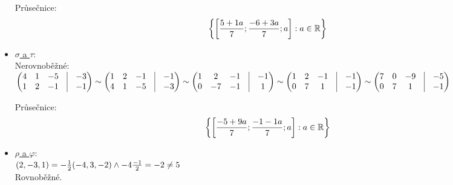 \begin{itemize}
		Průsečnice:
		  $$
			 \left\{{\left[{\frac{5+1 a}{7}; \frac{-6+3 a}{7}; a}\right]:a \in \mathbb{R}}\right\}
		 $$
	\item \underline{$\sigma$ a $\tau$}: \\
		Nerovnoběžné:\\
		 $ \begin{pmatrix}
			 4 &1 &-5 &\vline& -3 \\ 
			 1 &2 &-1 &\vline& -1 \\ 
		 \end{pmatrix}
		 \sim
		 \begin{pmatrix}
			 1 &2 &-1 &\vline& -1 \\ 
			 4 &1 &-5 &\vline& -3 \\ 
		 \end{pmatrix}
		 \sim
		 \begin{pmatrix}
			 1 &2 &-1 &\vline& -1 \\ 
			 0 &-7 &-1 &\vline& 1 \\ 
		 \end{pmatrix}
		 \sim
		 \begin{pmatrix}
			 1 &2 &-1 &\vline& -1 \\ 
			 0 &7 &1 &\vline& -1 \\ 
		 \end{pmatrix}
		 \sim
		 \begin{pmatrix}
			 7 &0 &-9 &\vline& -5 \\ 
			 0 &7 &1 &\vline& -1 \\ 
		 \end{pmatrix}
		 $


		Průsečnice:
		 $$ 
		  \left\{{\left[{\frac{-5+9 a}{7}; \frac{-1-1 a}{7}; a}\right]:a \in \mathbb{R}}\right\} 
		   $$ 
	\item \underline{$\rho$ a $\varphi$}: \\
		$(2 , -3,1) = -\f 12 (-4,3,-2) \land -4 \* \f {-1}2 = -2 \neq 5$\\
		Rovnoběžné.



\end{itemize}
